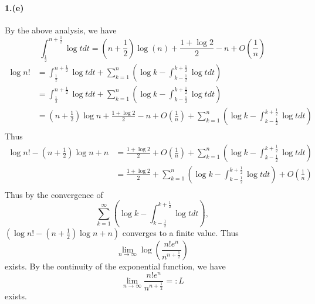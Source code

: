 \documentclass{article}
\begin{document}
\paragraph[short]{1.(e)}
{
By the above analysis, we have
$$\int_{\frac{1}{2}}^{n+\frac{1}{2}}\log t dt=
(n+\frac{1}{2})\log(n)+\frac{1+\log 2}{2}-n+O(\frac{1}{n})$$
\begin{align*}
    \log n!&=\int_{\frac{1}{2}}^{n+\frac{1}{2}}\log t dt+\sum_{k=1}^{n}\left(\log k-\int_{k-\frac{1}{2}}^{k+\frac{1}{2}}\log t dt\right)\\
    &=\int_{\frac{1}{2}}^{n+\frac{1}{2}}\log t dt+\sum_{k=1}^{n}\left(\log k-\int_{k-\frac{1}{2}}^{k+\frac{1}{2}}\log t dt\right)\\
    &=(n+\frac{1}{2})\log n+\frac{1+\log 2}{2}-n+O(\frac{1}{n})+\sum_{k=1}^{n}\left(\log k-\int_{k-\frac{1}{2}}^{k+\frac{1}{2}}\log t dt\right)\\
\end{align*}
Thus
\begin{align*}
    \log n!-(n+\frac{1}{2})\log n+n&=\frac{1+\log 2}{2}+O(\frac{1}{n})+\sum_{k=1}^{n}\left(\log k-\int_{k-\frac{1}{2}}^{k+\frac{1}{2}}\log t dt\right)\\
    &=\frac{1+\log 2}{2}+\sum_{k=1}^{n}\left(\log k-\int_{k-\frac{1}{2}}^{k+\frac{1}{2}}\log t dt\right)+O(\frac{1}{n})\\
\end{align*}
Thus by the convergence of 
$$\sum_{k=1}^{\infty}\left(\log k-\int_{k-\frac{1}{2}}^{k+\frac{1}{2}}\log t dt \right),$$
$\left(\log n!-(n+\frac{1}{2})\log n+n\right)$
converges to a finite value.
Thus
$$\lim_{n\to\infty}\log \left(\frac{n!e^n}{n^{n+\frac{1}{2}}}\right)$$
exists.
By the continuity of the exponential function, we have
$$\lim_{n\to\infty}\frac{n!e^n}{n^{n+\frac{1}{2}}}=:L$$
exists.
}
\end{document}
